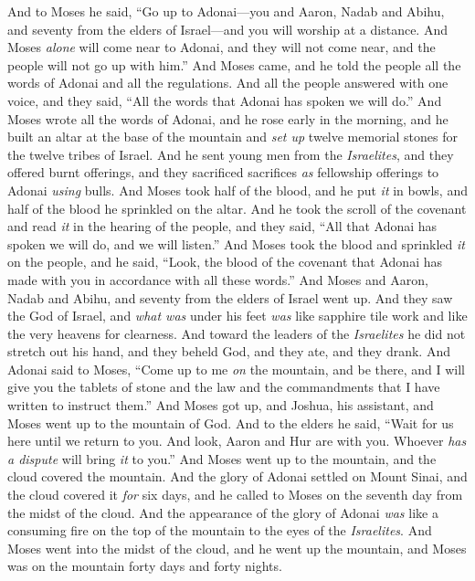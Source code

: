 \begin{biblechapter} %
 And to Moses he said, “Go up to Adonai—you and Aaron, Nadab and Abihu, and seventy from the elders of Israel—and you will worship at a distance.
\verse And Moses \textit{alone} will come near to Adonai, and they will not come near, and the people will not go up with him.”
\verse And Moses came, and he told the people all the words of Adonai and all the regulations. And all the people answered with one voice, and they said, “All the words that Adonai has spoken we will do.”
\verse And Moses wrote all the words of Adonai, and he rose early in the morning, and he built an altar at the base of the mountain and \textit{set up} twelve memorial stones for the twelve tribes of Israel.
\verse And he sent young men from the \textit{Israelites}, and they offered burnt offerings, and they sacrificed sacrifices \textit{as} fellowship offerings to Adonai \textit{using} bulls.
\verse And Moses took half of the blood, and he put \textit{it} in bowls, and half of the blood he sprinkled on the altar.
\verse And he took the scroll of the covenant and read \textit{it} in the hearing of the people, and they said, “All that Adonai has spoken we will do, and we will listen.”
\verse And Moses took the blood and sprinkled \textit{it} on the people, and he said, “Look, the blood of the covenant that Adonai has made with you in accordance with all these words.”
\verse And Moses and Aaron, Nadab and Abihu, and seventy from the elders of Israel went up.
\verse And they saw the God of Israel, and \textit{what was} under his feet \textit{was} like sapphire tile work and like the very heavens for clearness.
\verse And toward the leaders of the \textit{Israelites} he did not stretch out his hand, and they beheld God, and they ate, and they drank.
 And Adonai said to Moses, “Come up to me \textit{on} the mountain, and be there, and I will give you the tablets of stone and the law and the commandments that I have written to instruct them.”
\verse And Moses got up, and Joshua, his assistant, and Moses went up to the mountain of God.
\verse And to the elders he said, “Wait for us here until we return to you. And look, Aaron and Hur are with you. Whoever \textit{has a dispute} will bring \textit{it} to you.”
\verse And Moses went up to the mountain, and the cloud covered the mountain.
\verse And the glory of Adonai settled on Mount Sinai, and the cloud covered it \textit{for} six days, and he called to Moses on the seventh day from the midst of the cloud.
\verse And the appearance of the glory of Adonai \textit{was} like a consuming fire on the top of the mountain to the eyes of the \textit{Israelites}.
\verse And Moses went into the midst of the cloud, and he went up the mountain, and Moses was on the mountain forty days and forty nights.
\end{biblechapter}

